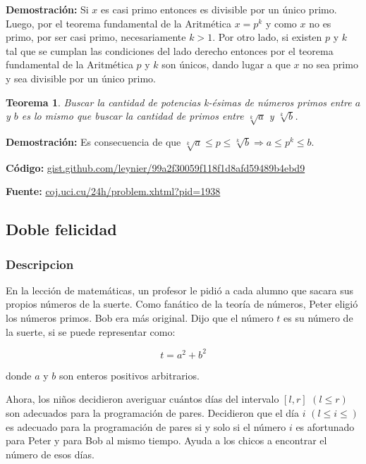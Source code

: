 \documentclass[12pt]{article}
\newcommand{\proof}{\textbf{Demostración:} }
\newcommand{\nl}{\vspace{0.3cm}}
\newtheorem{theorem}{Teorema}
\begin{document}
\proof Si $x$ es casi primo entonces es divisible por un único primo. Luego, por el teorema fundamental de la Aritmética $x = p^k$ y como $x$ no es primo, por ser casi primo, necesariamente $k > 1$. Por otro lado, si existen $p$ y $k$ tal que se cumplan las condiciones del lado derecho entonces por el teorema fundamental de la Aritmética $p$ y $k$ son únicos, dando lugar a que $x$ no sea primo y sea divisible por un único primo.

\begin{theorem}
	Buscar la cantidad de potencias k-ésimas de números primos entre $a$ y $b$ es lo mismo que buscar la cantidad de primos entre $\sqrt[k]{a}$ y $\sqrt[k]{b}$.
\end{theorem}

\proof Es consecuencia de que $\sqrt[k]{a} \leqslant p \leqslant \sqrt[k]{b} \Rightarrow a \leqslant p^k \leqslant b$.

\nl

\textbf{Código:} \href{https://gist.github.com/leynier/99a2f30059f118f1d8afd59489b4ebd9}{gist.github.com/leynier/99a2f30059f118f1d8afd59489b4ebd9}

\nl

\textbf{Fuente:} \href{http://coj.uci.cu/24h/problem.xhtml?pid=1938}{coj.uci.cu/24h/problem.xhtml?pid=1938}
 
\subsection{Doble felicidad}

\subsubsection{Descripcion}

En la lección de matemáticas, un profesor le pidió a cada alumno que sacara sus propios números de la suerte. Como fanático de la teoría de números, Peter eligió los números primos. Bob era más original. Dijo que el número $t$ es su número de la suerte, si se puede representar como:

$$ t = a^2 + b^2 $$

donde $a$ y $b$ son enteros positivos arbitrarios.

\nl

Ahora, los niños decidieron averiguar cuántos días del intervalo $[l, r]$ $(l \leqslant r)$ son adecuados para la programación de pares. Decidieron que el día $i$ $(l \leqslant i \leqslant)$ es adecuado para la programación de pares si y solo si el número $i$ es afortunado para Peter y para Bob al mismo tiempo. Ayuda a los chicos a encontrar el número de esos días.
\end{document}
